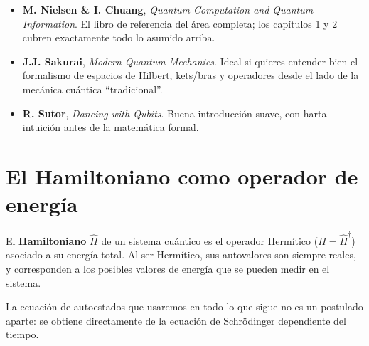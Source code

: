 \documentclass[12pt]{article}
\begin{document}
\begin{observacion}[title=\textbf{Libros recomendados para estos prerrequisitos}]
\begin{itemize}
    \item \textbf{M. Nielsen \& I. Chuang}, \textit{Quantum Computation and
    Quantum Information}. El libro de referencia del área completa; los
    capítulos 1 y 2 cubren exactamente todo lo asumido arriba.
    \item \textbf{J.J. Sakurai}, \textit{Modern Quantum Mechanics}. Ideal si
    quieres entender bien el formalismo de espacios de Hilbert, kets/bras y
    operadores desde el lado de la mecánica cuántica ``tradicional''.
    \item \textbf{R. Sutor}, \textit{Dancing with Qubits}. Buena introducción
    suave, con harta intuición antes de la matemática formal.
\end{itemize}
\end{observacion}

\newpage

\section{El Hamiltoniano como operador de energía}

\begin{definicion}
El \textbf{Hamiltoniano} $\hat{H}$ de un sistema cuántico es el operador
Hermítico ($\hat{H} = \hat{H}^\dagger$) asociado a su energía total. Al ser
Hermítico, sus autovalores son siempre reales, y corresponden a los
posibles valores de energía que se pueden medir en el sistema.
\end{definicion}

La ecuación de autoestados que usaremos en todo lo que sigue no es un
postulado aparte: se obtiene directamente de la ecuación de Schrödinger
dependiente del tiempo.
\end{document}
